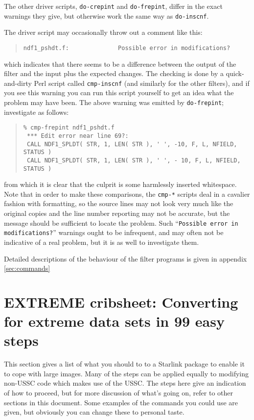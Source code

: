 \documentclass[twoside,11pt]{article}
\newcommand{\htmlref}[2]{#1}
\renewcommand{\_}{\texttt{\symbol{95}}}
\newcommand{\xdofilter}[1]{\htmlref{{\tt do-#1}}{do-xxx}}
\newcommand{\file}[1]{{\tt #1}}
\newcommand{\dofilter}[1]{{\tt do-#1}}
\newenvironment{squote}{\begin{quote}\begin{small}}{\end{small}\end{quote}}
\begin{document}
The other driver scripts, \dofilter{crepint} and \dofilter{frepint},
differ in the exact warnings they give, but otherwise work the
same way as \dofilter{inscnf}.

The driver script may occasionally throw out a comment like this:
\begin{squote}
\begin{verbatim}
ndf1_pshdt.f:              Possible error in modifications?
\end{verbatim}
\end{squote}
which indicates that there seems to be a difference between
the output of the filter and the input plus the expected changes.
The checking is done by a quick-and-dirty Perl script called
\file{cmp-inscnf} (and similarly for the other filters),
and if you see this warning you can run this script yourself
to get an idea what the problem may have been.
The above warning was emitted by \xdofilter{frepint}; investigate
as follows:
\begin{squote}
\begin{verbatim}
% cmp-frepint ndf1_pshdt.f
 *** Edit error near line 69?:
 CALL NDF1_SPLDT( STR, 1, LEN( STR ), ' ', -10, F, L, NFIELD, STATUS )
 CALL NDF1_SPLDT( STR, 1, LEN( STR ), ' ', - 10, F, L, NFIELD, STATUS )
\end{verbatim}
\end{squote}
from which it is clear that the culprit is some harmlessly inserted
whitespace.
Note that in order to make these comparisons, the \file{cmp-*} scripts
deal in a cavalier fashion with formatting, so the source
lines may not look very much like the original copies and the line number
reporting may not be accurate, but the message
should be sufficient to locate the problem.
Such ``{\tt Possible error in modifications?}''
warnings ought to be infrequent, and may often not be indicative
of a real problem, but it is as well to investigate them.

Detailed descriptions of the behaviour of the filter programs is
given in appendix \ref{sec:commands}


\section{EXTREME cribsheet: Converting for extreme data sets in 99 easy
                            steps\label{sec:cribsheet}}

This section gives a list of what you should to to
a Starlink package to enable it to cope with large images.
Many of the steps can be applied equally
to modifying non-USSC code which makes use of the USSC.
The steps here give an indication of how to proceed,
but for more discussion of what's going on, refer to other sections
in this document.
Some examples of the commands you could use are given,
but obviously you can change these to personal taste.
\end{document}
